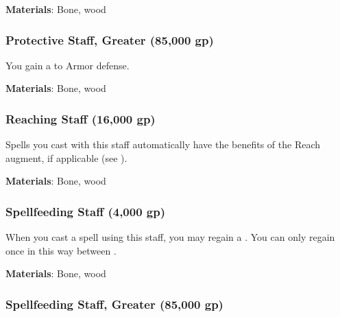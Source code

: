 \vspace{0.25em}
\textbf{Materials}: Bone, wood


\lowercase{\hypertarget{item:Protective Staff, Greater}{}}\label{item:Protective Staff, Greater}
\hypertarget{item:Protective Staff, Greater}{\subsubsection{Protective Staff, Greater\hfill{} (85,000 gp)}}

You gain a   to Armor defense.



\vspace{0.25em}
\textbf{Materials}: Bone, wood


\lowercase{\hypertarget{item:Reaching Staff}{}}\label{item:Reaching Staff}
\hypertarget{item:Reaching Staff}{\subsubsection{Reaching Staff\hfill{} (16,000 gp)}}

Spells you cast with this staff automatically have the benefits of the Reach augment, if applicable (see ).



\vspace{0.25em}
\textbf{Materials}: Bone, wood


\lowercase{\hypertarget{item:Spellfeeding Staff}{}}\label{item:Spellfeeding Staff}
\hypertarget{item:Spellfeeding Staff}{\subsubsection{Spellfeeding Staff\hfill{} (4,000 gp)}}

When you cast a spell using this staff, you may regain a .
You can only regain  once in this way between .



\vspace{0.25em}
\textbf{Materials}: Bone, wood


\lowercase{\hypertarget{item:Spellfeeding Staff, Greater}{}}\label{item:Spellfeeding Staff, Greater}
\hypertarget{item:Spellfeeding Staff, Greater}{\subsubsection{Spellfeeding Staff, Greater\hfill{} (85,000 gp)}}


